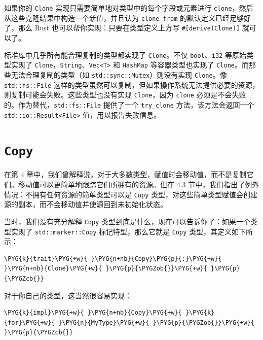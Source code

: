 如果你的 \texttt{Clone} 实现只需要简单地对类型中的每个字段或元素进行 \texttt{clone}，然后从这些克隆结果中构造一个新值，并且认为 \texttt{clone\_from} 的默认定义已经足够好了，那么 Rust 也可以帮你实现：只要在类型定义上方写 \texttt{\#[derive(Clone)]} 就可以了。

标准库中几乎所有能合理复制的类型都实现了 \texttt{Clone}。不仅 \texttt{bool}、\texttt{i32} 等原始类型实现了 \texttt{Clone}，\texttt{String}、\texttt{Vec<T>} 和 \texttt{HashMap} 等容器类型也实现了 \texttt{Clone}。而那些无法合理复制的类型（如 \texttt{std::sync::Mutex}）则没有实现 \texttt{Clone}。像 \texttt{std::fs::File} 这样的类型虽然可以复制，但如果操作系统无法提供必要的资源，则复制可能会失败。这些类型也没有实现 \texttt{Clone}，因为 \texttt{clone} 必须是不会失败的。作为替代，\texttt{std::fs::File} 提供了一个 \texttt{try\_clone} 方法，该方法会返回一个 \texttt{std::io::Result<File>} 值，用以报告失败信息。

\section{\texttt{Copy}}

在第 4 章中，我们曾解释说，对于大多数类型，赋值时会移动值，而不是复制它们。移动值可以更简单地跟踪它们所拥有的资源。但在 4.3 节中，我们指出了例外情况：不拥有任何资源的简单类型可以是 \texttt{Copy} 类型，对这些简单类型赋值会创建源的副本，而不会移动值并使源回到未初始化状态。

当时，我们没有充分解释 \texttt{Copy} 类型到底是什么，现在可以告诉你了：如果一个类型实现了 \texttt{std::marker::Copy} 标记特型，那么它就是 \texttt{Copy} 类型，其定义如下所示：

\begin{Verbatim}[commandchars=\\\{\},breaklines=true,breakanywhere=true,fontsize=\codefont,xleftmargin=17bp]
\PYG{k}{trait}\PYG{+w}{ }\PYG{n+nb}{Copy}\PYG{p}{:}\PYG{+w}{ }\PYG{n+nb}{Clone}\PYG{+w}{ }\PYG{p}{\PYGZob{}}\PYG{+w}{ }\PYG{p}{\PYGZcb{}}
\end{Verbatim}

对于你自己的类型，这当然很容易实现：

\begin{Verbatim}[commandchars=\\\{\},breaklines=true,breakanywhere=true,fontsize=\codefont,xleftmargin=17bp]
\PYG{k}{impl}\PYG{+w}{ }\PYG{n+nb}{Copy}\PYG{+w}{ }\PYG{k}{for}\PYG{+w}{ }\PYG{n}{MyType}\PYG{+w}{ }\PYG{p}{\PYGZob{}}\PYG{+w}{ }\PYG{p}{\PYGZcb{}}
\end{Verbatim}


